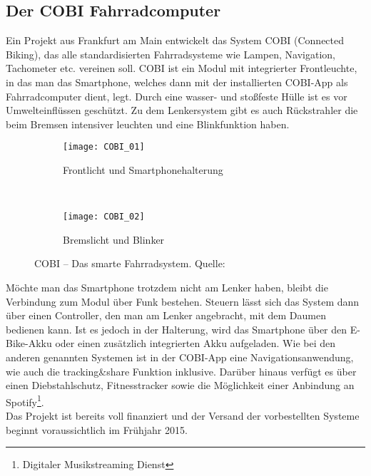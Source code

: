 \subsection{Der COBI Fahrradcomputer}
Ein Projekt aus Frankfurt am Main entwickelt das System \textsc{COBI} (Connected Biking), das alle standardisierten Fahrradsysteme wie Lampen, Navigation, Tachometer etc. vereinen soll. \textsc{COBI} ist ein Modul mit integrierter Frontleuchte, in das man das \gls{Smartphone}, welches dann mit der installierten \textsc{COBI}-\Gls{App} als Fahrradcomputer dient, legt. Durch eine wasser- und stoßfeste Hülle ist es vor Umwelteinflüssen geschützt. Zu dem Lenkersystem gibt es auch Rückstrahler die beim Bremsen intensiver leuchten und eine Blinkfunktion haben.\\
\begin{figure}[H]
        \centering
        \begin{subfigure}[b]{0.49\textwidth}
                \texttt{[image: COBI\_01]}
                \caption{Frontlicht und Smartphonehalterung}
                \label{fig:cobi1}
        \end{subfigure}%
        ~ %
        \begin{subfigure}[b]{0.49\textwidth}
                \texttt{[image: COBI\_02]}
                \caption{Bremslicht und Blinker}
                \label{fig:cobi2}
        \end{subfigure}
        \grayRule
        \caption[COBI]{COBI -- Das smarte Fahrradsystem. Quelle: \cite{cobi_pic}}
        \label{fig:cobi}
\end{figure}
Möchte man das \gls{Smartphone} trotzdem nicht am Lenker haben, bleibt die Verbindung zum Modul über Funk bestehen. Steuern lässt sich das System dann über einen Controller, den man am Lenker angebracht, mit dem Daumen bedienen kann. Ist es jedoch in der Halterung, wird das \gls{Smartphone} über den E-Bike-Akku oder einen zusätzlich integrierten Akku aufgeladen. Wie bei den anderen genannten Systemen ist in der \textsc{COBI}-\Gls{App} eine Navigationsanwendung, wie auch die tracking\&share Funktion inklusive. Darüber hinaus verfügt es über einen Diebstahlschutz, Fitnesstracker sowie die Möglichkeit einer Anbindung an Spotify\footnote{ Digitaler Musikstreaming Dienst}.\\
Das Projekt ist bereits voll finanziert und der Versand der vorbestellten Systeme beginnt voraussichtlich im Frühjahr 2015. \cite{cobi}
